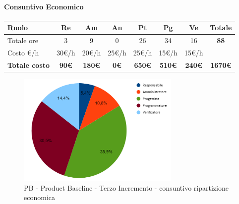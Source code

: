 \paragraph{Consuntivo Economico}
\begin{center}
	\renewcommand{\arraystretch}{1.8}
	\begin{tabular}{ |m{6em}|c|c|c|c|c|c|c| }
	\hline
	\textbf{Ruolo} & \textbf{Re} & \textbf{Am} &  \textbf{An} &  \textbf{Pt} &  \textbf{Pg} &  \textbf{Ve} &  \textbf{Totale}\\
    \hline
    Totale ore & 3 & 9 & 0 & 26 & 34 & 16 & \textbf{88}\\
    \hline
    Costo \euro/h & 30\euro/h & 20\euro/h & 25\euro/h & 25\euro/h & 15\euro/h & 15\euro/h & \\
    \hline
    \textbf{Totale costo} & \textbf{90\euro} & \textbf{180\euro} &  \textbf{0\euro} & \textbf{650\euro} &  \textbf{510\euro} &  \textbf{240\euro} &  \textbf{1670\euro} \\
    \hline
	\end{tabular}

    \begin{figure}[H]
        \centering\includegraphics[width=0.7\textwidth, height=0.7\textheight, keepaspectratio]{images/consuntivo/consuntivo-PB-costo-terzo-incremento.png}
        \caption{PB - Product Baseline - Terzo Incremento - consuntivo ripartizione economica}
    \end{figure}
\end{center}

